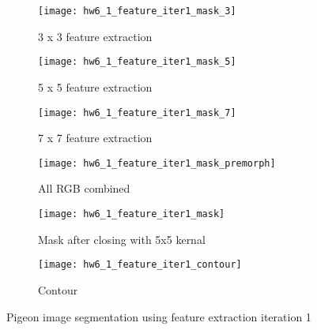 \documentclass[11pt]{article}
\begin{document}
\begin{figure}[H]
\begin{subfigure}{.5\textwidth}
  \centering
  \texttt{[image: hw6\_1\_feature\_iter1\_mask\_3]}
  \caption{3 x 3 feature extraction}
  \label{}
\end{subfigure}
\begin{subfigure}{.5\textwidth}
  \centering
  \texttt{[image: hw6\_1\_feature\_iter1\_mask\_5]}
  \caption{5 x 5 feature extraction}
  \label{}
\end{subfigure}

\begin{subfigure}{.5\textwidth}
  \centering
  \texttt{[image: hw6\_1\_feature\_iter1\_mask\_7]}
  \caption{7 x 7 feature extraction}
  \label{}
\end{subfigure}
\begin{subfigure}{.5\textwidth}
  \centering
  \texttt{[image: hw6\_1\_feature\_iter1\_mask\_premorph]}
  \caption{All RGB combined}
  \label{}
\end{subfigure}

\begin{subfigure}{.5\textwidth}
  \centering
  \texttt{[image: hw6\_1\_feature\_iter1\_mask]}
  \caption{Mask after closing with 5x5 kernal}
  \label{}
\end{subfigure}
\begin{subfigure}{.5\textwidth}
  \centering
  \texttt{[image: hw6\_1\_feature\_iter1\_contour]}
  \caption{Contour}
  \label{}
\end{subfigure}

\caption{Pigeon image segmentation using feature extraction iteration 1}
\label{}
\end{figure}
\end{document}
